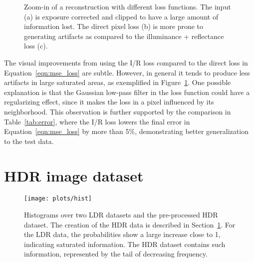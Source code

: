 \documentclass[acmtog]{acmart}
\newcommand{\figref}[1]{Figure~\ref{fig:#1}}
\newcommand{\tabref}[1]{Table~\ref{tab:#1}}
\newcommand{\eqnref}[1]{Equation~\ref{eqn:#1}}
\newcommand{\secref}[1]{Section~\ref{sec:#1}}
\newcommand\belowfigspace{-2pt}
\begin{document}
\begin{figure}[t]
	\newcommand\ww{0.116}
	\centering
	\vspace{-10pt}
	\caption{\label{fig:loss} Zoom-in of a reconstruction with different loss functions. The input (a) is exposure corrected and clipped to have a large amount of information lost. The direct pixel loss (b) is more prone to generating artifacts as compared to the illuminance + reflectance loss (c).}
	\vspace{\belowfigspace}
\end{figure}

The visual improvements from using the I/R loss compared to the direct loss in \eqnref{mse_loss} are subtle. However, in general it tends to produce less artifacts in large saturated areas, as exemplified in \figref{loss}. One possible explanation is that the Gaussian low-pass filter in the loss function could have a regularizing effect, since it makes the loss in a pixel influenced by its neighborhood. This observation is further supported by the comparison in \tabref{error}, where the I/R loss lowers the final error in \eqnref{mse_loss} by more than 5\%, demonstrating better generalization to the test data.
 

\section{HDR image dataset}\label{sec:hdr_db}
\begin{figure}
	\vspace{-2pt}
	\centering
	\texttt{[image: plots/hist]}
	\vspace{-10pt}
	\caption{\label{fig:hist} Histograms over two LDR datasets and the pre-processed HDR dataset. The creation of the HDR data is described in \secref{hdr_db}. For the LDR data, the probabilities show a large increase close to 1, indicating saturated information. The HDR dataset contains such information, represented by the tail of decreasing frequency.} 
	\vspace{\belowfigspace}
\end{figure}
\end{document}
